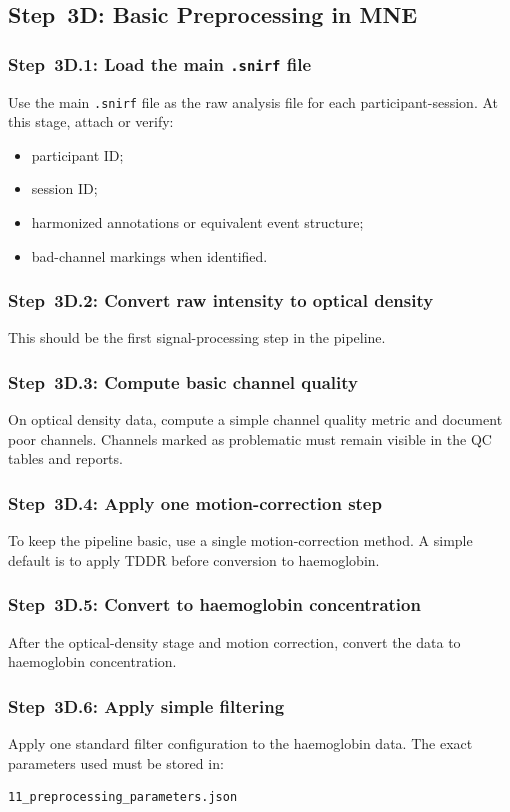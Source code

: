 \documentclass[11pt]{article}
\begin{document}
\subsection{Step~3D: Basic Preprocessing in MNE}

\subsubsection{Step~3D.1: Load the main \texttt{.snirf} file}
Use the main \texttt{.snirf} file as the raw analysis file for each participant-session.
At this stage, attach or verify:
\begin{itemize}
    \item participant ID;
    \item session ID;
    \item harmonized annotations or equivalent event structure;
    \item bad-channel markings when identified.
\end{itemize}

\subsubsection{Step~3D.2: Convert raw intensity to optical density}
This should be the first signal-processing step in the pipeline.

\subsubsection{Step~3D.3: Compute basic channel quality}
On optical density data, compute a simple channel quality metric and document poor channels.
Channels marked as problematic must remain visible in the QC tables and reports.

\subsubsection{Step~3D.4: Apply one motion-correction step}
To keep the pipeline basic, use a single motion-correction method.
A simple default is to apply TDDR before conversion to haemoglobin.

\subsubsection{Step~3D.5: Convert to haemoglobin concentration}
After the optical-density stage and motion correction, convert the data to haemoglobin concentration.

\subsubsection{Step~3D.6: Apply simple filtering}
Apply one standard filter configuration to the haemoglobin data.
The exact parameters used must be stored in:
\begin{verbatim}
11_preprocessing_parameters.json
\end{verbatim}
\end{document}
